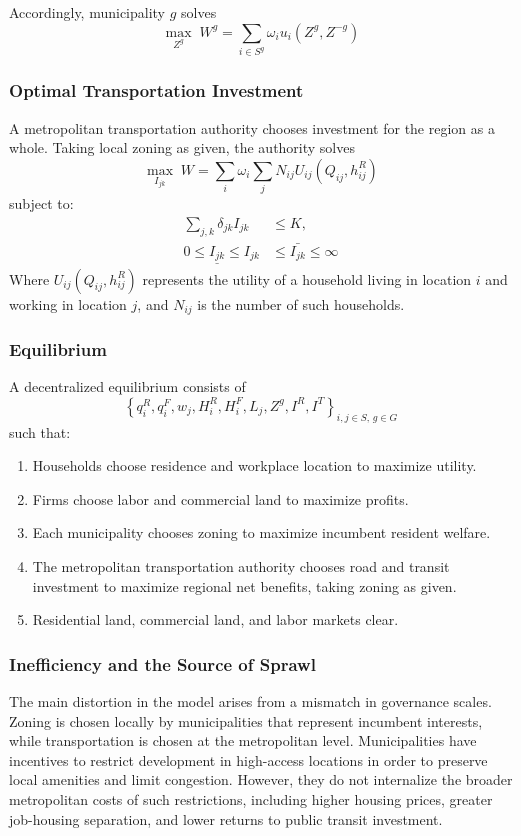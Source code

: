 \documentclass[12pt, a4paper]{article}
\begin{document}
Accordingly, municipality \(g\) solves
\[
\max_{Z^g} \; W^g=\sum_{i\in S^g} \omega_i u_i(Z^g, Z^{-g})
\]


\subsubsection{Optimal Transportation Investment}

A metropolitan transportation authority chooses investment for the region as a whole. Taking local zoning as given, the authority solves
\[
\max_{I_{jk}} \; W=\sum_{i} \omega_{i} \sum_{j} N_{ij} U_{ij}(Q_{ij}, h_{ij}^R)
\]
subject to:
\begin{align}
    \sum_{j,k} \delta_{jk} I_{jk} & \leq K, \\
    0 \leq \underline{I_{jk}} \leq I_{jk} & \leq \bar{I_{jk}} \leq \infty
\end{align}
Where $U_{ij}(Q_{ij}, h_{ij}^R)$ represents the utility of a household living in location $i$ and working in location $j$, and $N_{ij}$ is the number of such households. 


\subsubsection{Equilibrium}

A decentralized equilibrium consists of
\[
\left\{
q_i^R, q_i^F, w_j, H_i^R, H_i^F, L_j, Z^g, I^R, I^T
\right\}_{i,j\in S,\, g\in G}
\]
such that:

\begin{enumerate}
    \item Households choose residence and workplace location to maximize utility.
    \item Firms choose labor and commercial land to maximize profits.
    \item Each municipality chooses zoning to maximize incumbent resident welfare.
    \item The metropolitan transportation authority chooses road and transit investment to maximize regional net benefits, taking zoning as given.
    \item Residential land, commercial land, and labor markets clear.
\end{enumerate}

\subsubsection{Inefficiency and the Source of Sprawl}

The main distortion in the model arises from a mismatch in governance scales. Zoning is chosen locally by municipalities that represent incumbent interests, while transportation is chosen at the metropolitan level. Municipalities have incentives to restrict development in high-access locations in order to preserve local amenities and limit congestion. However, they do not internalize the broader metropolitan costs of such restrictions, including higher housing prices, greater job-housing separation, and lower returns to public transit investment.
\end{document}
